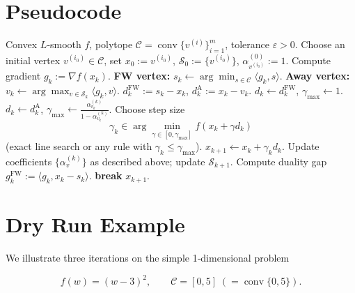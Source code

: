 \documentclass{article}
\begin{document}
\section*{Pseudocode}
\begin{algorithm}[H]
\caption{Away‑Step Frank–Wolfe (AFW)}
\begin{algorithmic}[1]
\Require Convex $L$‑smooth $f$, polytope $\mathcal{C}=\operatorname{conv}\{v^{(i)}\}_{i=1}^m$, tolerance $\varepsilon>0$.
\State Choose an initial vertex $v^{(i_0)}\in\mathcal{C}$, set $x_0:=v^{(i_0)}$, $\mathcal{S}_0:=\{v^{(i_0)}\}$, $\alpha_{v^{(i_0)}}^{(0)}:=1$.
    \State Compute gradient $g_k:=\nabla f(x_k)$.
    \State \textbf{FW vertex:} $s_k\gets\arg\min_{s\in\mathcal{C}}\langle g_k,s\rangle$.
    \State \textbf{Away vertex:} $v_k\gets\arg\max_{v\in\mathcal{S}_k}\langle g_k,v\rangle$.
    \State $d^{\text{FW}}_k:=s_k-x_k$, $d^{\text{A}}_k:=x_k-v_k$.
        \State $d_k\gets d^{\text{FW}}_k$, $\gamma_{\max}\gets 1$.
    \Else
        \State $d_k\gets d^{\text{A}}_k$, $\displaystyle\gamma_{\max}\gets\frac{\alpha_{v_k}^{(k)}}{1-\alpha_{v_k}^{(k)}}$.
    \EndIf
    \State Choose step size 
    \[
    \gamma_k\in\arg\min_{\gamma\in[0,\gamma_{\max}]}f(x_k+\gamma d_k)
    \] 
    (exact line search or any rule with $\gamma_k\le\gamma_{\max}$).
    \State $x_{k+1}\gets x_k+\gamma_k d_k$.
    \State Update coefficients $\{\alpha_v^{(k)}\}$ as described above; update $\mathcal{S}_{k+1}$.
    \State Compute duality gap $g_k^{\text{FW}}:=\langle g_k, x_k-s_k\rangle$.
        \State \textbf{break}
    \EndIf
\EndFor
\State \Return $x_{k+1}$.
\end{algorithmic}
\end{algorithm}

\section*{Dry Run Example}
We illustrate three iterations on the simple 1‑dimensional problem  

\[
f(w)=(w-3)^2,\qquad \mathcal{C}=[0,5]\; (= \operatorname{conv}\{0,5\}).
\]
\end{document}
